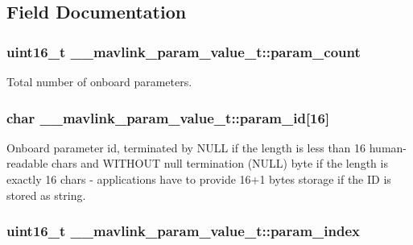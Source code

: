 \subsection{Field Documentation}
\hypertarget{struct____mavlink__param__value__t_ab53bec8370ac590fc761b9a9de49f6b6}{
\subsubsection[{param\+\_\+count}]{\setlength{\rightskip}{0pt plus 5cm}uint16\+\_\+t \+\_\+\+\_\+mavlink\+\_\+param\+\_\+value\+\_\+t\+::param\+\_\+count}}\label{struct____mavlink__param__value__t_ab53bec8370ac590fc761b9a9de49f6b6}


Total number of onboard parameters. 

\hypertarget{struct____mavlink__param__value__t_af686385ecc22c23ab4e2b5d115838119}{
\subsubsection[{param\+\_\+id}]{\setlength{\rightskip}{0pt plus 5cm}char \+\_\+\+\_\+mavlink\+\_\+param\+\_\+value\+\_\+t\+::param\+\_\+id\mbox{[}16\mbox{]}}}\label{struct____mavlink__param__value__t_af686385ecc22c23ab4e2b5d115838119}


Onboard parameter id, terminated by N\+U\+L\+L if the length is less than 16 human-\/readable chars and W\+I\+T\+H\+O\+U\+T null termination (N\+U\+L\+L) byte if the length is exactly 16 chars -\/ applications have to provide 16+1 bytes storage if the I\+D is stored as string. 

\hypertarget{struct____mavlink__param__value__t_a213d71adbd95b241f962dd1d375c3a5a}{
\subsubsection[{param\+\_\+index}]{\setlength{\rightskip}{0pt plus 5cm}uint16\+\_\+t \+\_\+\+\_\+mavlink\+\_\+param\+\_\+value\+\_\+t\+::param\+\_\+index}}\label{struct____mavlink__param__value__t_a213d71adbd95b241f962dd1d375c3a5a}


